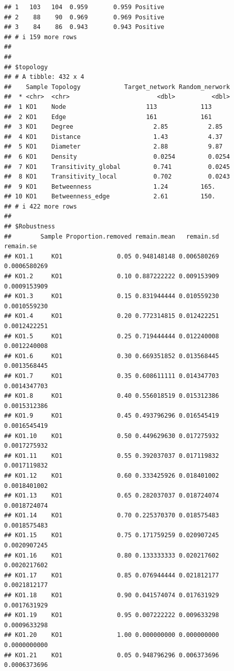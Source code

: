 \documentclass[
]{book}
\begin{document}
\begin{verbatim}
## 1   103   104  0.959       0.959 Positive      
## 2    88    90  0.969       0.969 Positive      
## 3    84    86  0.943       0.943 Positive      
## # i 159 more rows
## 
## 
## $topology
## # A tibble: 432 x 4
##    Sample Topology            Target_network Random_nerwork
##  * <chr>  <chr>                        <dbl>          <dbl>
##  1 KO1    Node                      113            113     
##  2 KO1    Edge                      161            161     
##  3 KO1    Degree                      2.85           2.85  
##  4 KO1    Distance                    1.43           4.37  
##  5 KO1    Diameter                    2.88           9.87  
##  6 KO1    Density                     0.0254         0.0254
##  7 KO1    Transitivity_global         0.741          0.0245
##  8 KO1    Transitivity_local          0.702          0.0243
##  9 KO1    Betweenness                 1.24         165.    
## 10 KO1    Betweenness_edge            2.61         150.    
## # i 422 more rows
## 
## $Robustness
##        Sample Proportion.removed remain.mean   remain.sd    remain.se
## KO1.1     KO1               0.05 0.948148148 0.006580269 0.0006580269
## KO1.2     KO1               0.10 0.887222222 0.009153909 0.0009153909
## KO1.3     KO1               0.15 0.831944444 0.010559230 0.0010559230
## KO1.4     KO1               0.20 0.772314815 0.012422251 0.0012422251
## KO1.5     KO1               0.25 0.719444444 0.012240008 0.0012240008
## KO1.6     KO1               0.30 0.669351852 0.013568445 0.0013568445
## KO1.7     KO1               0.35 0.608611111 0.014347703 0.0014347703
## KO1.8     KO1               0.40 0.556018519 0.015312386 0.0015312386
## KO1.9     KO1               0.45 0.493796296 0.016545419 0.0016545419
## KO1.10    KO1               0.50 0.449629630 0.017275932 0.0017275932
## KO1.11    KO1               0.55 0.392037037 0.017119832 0.0017119832
## KO1.12    KO1               0.60 0.333425926 0.018401002 0.0018401002
## KO1.13    KO1               0.65 0.282037037 0.018724074 0.0018724074
## KO1.14    KO1               0.70 0.225370370 0.018575483 0.0018575483
## KO1.15    KO1               0.75 0.171759259 0.020907245 0.0020907245
## KO1.16    KO1               0.80 0.133333333 0.020217602 0.0020217602
## KO1.17    KO1               0.85 0.076944444 0.021812177 0.0021812177
## KO1.18    KO1               0.90 0.041574074 0.017631929 0.0017631929
## KO1.19    KO1               0.95 0.007222222 0.009633298 0.0009633298
## KO1.20    KO1               1.00 0.000000000 0.000000000 0.0000000000
## KO1.21    KO1               0.05 0.948796296 0.006373696 0.0006373696

\end{verbatim}
\end{document}
